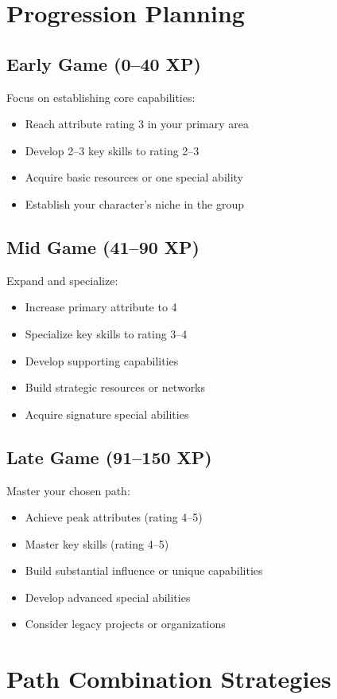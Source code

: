 \begin{multicols}{2}
\section{Progression Planning}

\subsection*{Early Game (0--40 XP)}
Focus on establishing core capabilities:
\begin{itemize}
\item Reach attribute rating 3 in your primary area
\item Develop 2--3 key skills to rating 2--3
\item Acquire basic resources or one special ability
\item Establish your character's niche in the group
\end{itemize}

\subsection*{Mid Game (41--90 XP)}
Expand and specialize:
\begin{itemize}
\item Increase primary attribute to 4
\item Specialize key skills to rating 3--4
\item Develop supporting capabilities
\item Build strategic resources or networks
\item Acquire signature special abilities
\end{itemize}

\subsection*{Late Game (91--150 XP)}
Master your chosen path:
\begin{itemize}
\item Achieve peak attributes (rating 4--5)
\item Master key skills (rating 4--5)
\item Build substantial influence or unique capabilities
\item Develop advanced special abilities
\item Consider legacy projects or organizations
\end{itemize}

\section{Path Combination Strategies}


\end{multicols}
